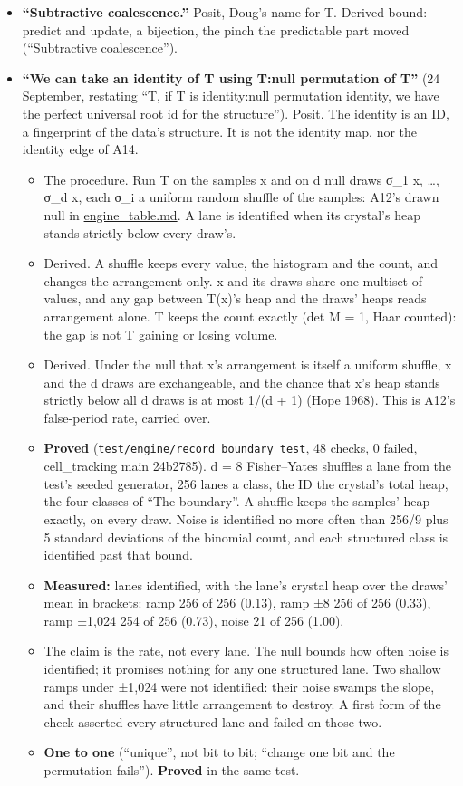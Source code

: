 \begin{itemize}
\item \textbf{“Subtractive coalescence.”} Posit, Doug's name for T. Derived bound: predict and update, a bijection, the pinch the predictable part moved (“Subtractive coalescence”).
\item \textbf{“We can take an identity of T using T:null permutation of T”} (24 September, restating “T, if T is identity:null permutation identity, we have the perfect universal root id for the structure”). Posit. The identity is an ID, a fingerprint of the data's structure. It is not the identity map, nor the identity edge of A14.

\begin{itemize}
\item The procedure. Run T on the samples x and on d null draws σ\_\allowbreak{}1 x, …, σ\_\allowbreak{}d x, each σ\_\allowbreak{}i a uniform random shuffle of the samples: A12's drawn null in \hyperref[chap:engine-table]{engine\_\allowbreak{}table.md}. A lane is identified when its crystal's heap stands strictly below every draw's.
\item Derived. A shuffle keeps every value, the histogram and the count, and changes the arrangement only. x and its draws share one multiset of values, and any gap between T(x)'s heap and the draws' heaps reads arrangement alone. T keeps the count exactly (det M = 1, Haar counted): the gap is not T gaining or losing volume.
\item Derived. Under the null that x's arrangement is itself a uniform shuffle, x and the d draws are exchangeable, and the chance that x's heap stands strictly below all d draws is at most 1/(d + 1) (Hope 1968). This is A12's false-period rate, carried over.
\item \textbf{Proved} (\texttt{test/\allowbreak{}engine/\allowbreak{}record\_\allowbreak{}boundary\_\allowbreak{}test}, 48 checks, 0 failed, cell\_\allowbreak{}tracking main 24b2785). d = 8 Fisher–Yates shuffles a lane from the test's seeded generator, 256 lanes a class, the ID the crystal's total heap, the four classes of “The boundary”. A shuffle keeps the samples' heap exactly, on every draw. Noise is identified no more often than 256/9 plus 5 standard deviations of the binomial count, and each structured class is identified past that bound.
\item \textbf{Measured:} lanes identified, with the lane's crystal heap over the draws' mean in brackets: ramp 256 of 256 (0.13), ramp ±8 256 of 256 (0.33), ramp ±1,024 254 of 256 (0.73), noise 21 of 256 (1.00).
\item The claim is the rate, not every lane. The null bounds how often noise is identified; it promises nothing for any one structured lane. Two shallow ramps under ±1,024 were not identified: their noise swamps the slope, and their shuffles have little arrangement to destroy. A first form of the check asserted every structured lane and failed on those two.
\item \textbf{One to one} (“unique”, not bit to bit; “change one bit and the permutation fails”). \textbf{Proved} in the same test.


\end{itemize}
\end{itemize}
